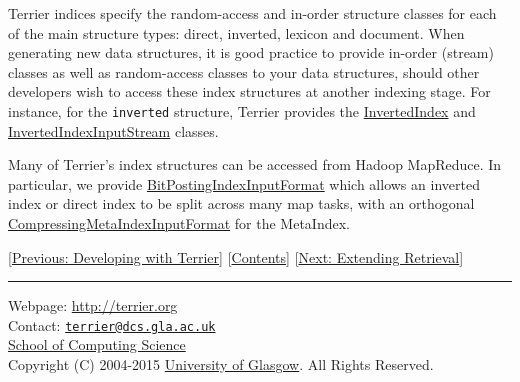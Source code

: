Terrier indices specify the random-access and in-order structure classes
for each of the main structure types: direct, inverted, lexicon and
document. When generating new data structures, it is good practice to
provide in-order (stream) classes as well as random-access classes to
your data structures, should other developers wish to access these index
structures at another indexing stage. For instance, for the
\texttt{inverted} structure, Terrier provides the
\href{javadoc/org/terrier/structures/bit/InvertedIndex.html}{InvertedIndex}
and
\href{javadoc/org/terrier/structures/bit/InvertedIndexInputStream.html}{InvertedIndexInputStream}
classes.

Many of Terrier's index structures can be accessed from Hadoop
MapReduce. In particular, we provide
\href{javadoc/org/terrier/structures/indexing/singlepass/hadoop/BitPostingIndexInputFormat.html}{BitPostingIndexInputFormat}
which allows an inverted index or direct index to be split across many
map tasks, with an orthogonal
\href{javadoc/org/terrier/structures/CompressingMetaIndex.CompressingMetaIndexInputFormat.html}{CompressingMetaIndexInputFormat}
for the MetaIndex.

{[}\href{terrier_develop.html}{Previous: Developing with Terrier}{]}
{[}\href{index.html}{Contents}{]} {[}\href{extend_retrieval.html}{Next:
Extending Retrieval}{]}

\begin{center}\rule{0.5\linewidth}{\linethickness}\end{center}

Webpage: \url{http://terrier.org}\\
Contact:
\href{mailto:terrier@dcs.gla.ac.uk}{\nolinkurl{terrier@dcs.gla.ac.uk}}\\
\href{http://www.dcs.gla.ac.uk/}{School of Computing Science}\\
Copyright (C) 2004-2015 \href{http://www.gla.ac.uk/}{University of
Glasgow}. All Rights Reserved.
